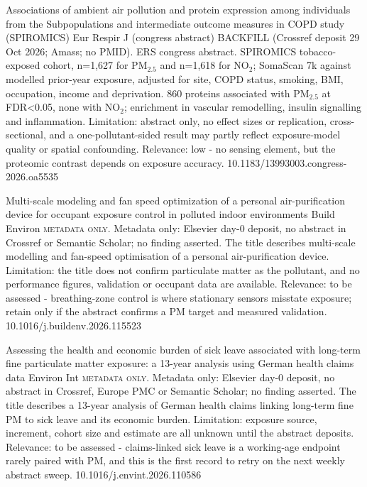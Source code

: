 \documentclass[10pt]{article}
\begin{document}
{Associations of ambient air pollution and protein expression among individuals from the Subpopulations and intermediate outcome measures in COPD study (SPIROMICS)}
{Eur Respir J (congress abstract)}
{BACKFILL (Crossref deposit 29 Oct 2026; Amass; no PMID). ERS congress abstract. SPIROMICS tobacco-exposed cohort, n=1,627 for PM$_{2.5}$ and n=1,618 for NO$_2$; SomaScan 7k against modelled prior-year exposure, adjusted for site, COPD status, smoking, BMI, occupation, income and deprivation. 860 proteins associated with PM$_{2.5}$ at FDR<0.05, none with NO$_2$; enrichment in vascular remodelling, insulin signalling and inflammation. Limitation: abstract only, no effect sizes or replication, cross-sectional, and a one-pollutant-sided result may partly reflect exposure-model quality or spatial confounding. Relevance: low - no sensing element, but the proteomic contrast depends on exposure accuracy.}
{10.1183/13993003.congress-2026.oa5535}

\par{}\baselineskip{}\baselineskip
{}

{Multi-scale modeling and fan speed optimization of a personal air-purification device for occupant exposure control in polluted indoor environments}
{Build Environ}
{\textsc{metadata only.} Metadata only: Elsevier day-0 deposit, no abstract in Crossref or Semantic Scholar; no finding asserted. The title describes multi-scale modelling and fan-speed optimisation of a personal air-purification device. Limitation: the title does not confirm particulate matter as the pollutant, and no performance figures, validation or occupant data are available. Relevance: to be assessed - breathing-zone control is where stationary sensors misstate exposure; retain only if the abstract confirms a PM target and measured validation.}
{10.1016/j.buildenv.2026.115523}

\par{}\baselineskip{}\baselineskip
{}

{Assessing the health and economic burden of sick leave associated with long-term fine particulate matter exposure: a 13-year analysis using German health claims data}
{Environ Int}
{\textsc{metadata only.} Metadata only: Elsevier day-0 deposit, no abstract in Crossref, Europe PMC or Semantic Scholar; no finding asserted. The title describes a 13-year analysis of German health claims linking long-term fine PM to sick leave and its economic burden. Limitation: exposure source, increment, cohort size and estimate are all unknown until the abstract deposits. Relevance: to be assessed - claims-linked sick leave is a working-age endpoint rarely paired with PM, and this is the first record to retry on the next weekly abstract sweep.}
{10.1016/j.envint.2026.110586}
\end{document}
